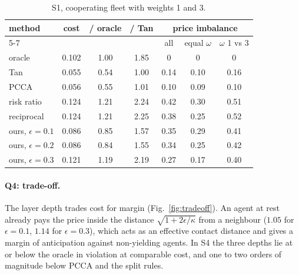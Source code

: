 \documentclass[11pt]{article}
\theoremstyle{definition}
\theoremstyle{remark}
\begin{document}
\begin{table}[h]
\centering\small
\begin{tabular}{lcccccc}
\toprule
method & cost & / oracle & / Tan & \multicolumn{3}{c}{price imbalance}\\
\cmidrule(lr){5-7}
 & & & & all & equal $\omega$ & $\omega$ 1 vs 3\\
\midrule
oracle & 0.102 & 1.00 & 1.85 & 0 & 0 & 0\\
Tan & 0.055 & 0.54 & 1.00 & 0.14 & 0.10 & 0.16\\
PCCA & 0.056 & 0.55 & 1.01 & 0.10 & 0.09 & 0.10\\
risk ratio & 0.124 & 1.21 & 2.24 & 0.42 & 0.30 & 0.51\\
reciprocal & 0.124 & 1.21 & 2.25 & 0.38 & 0.25 & 0.52\\
ours, $\epsilon=0.1$ & 0.086 & 0.85 & 1.57 & 0.35 & 0.29 & 0.41\\
ours, $\epsilon=0.2$ & 0.086 & 0.84 & 1.55 & 0.34 & 0.25 & 0.42\\
ours, $\epsilon=0.3$ & 0.121 & 1.19 & 2.19 & 0.27 & 0.17 & 0.40\\
\bottomrule
\end{tabular}
\caption{S1, cooperating fleet with weights 1 and 3.}
\label{tab:s1}
\end{table}

\paragraph{Q4: trade-off.} The layer depth trades cost for margin (Fig.~\ref{fig:tradeoff}). An agent at rest already pays the price inside the distance $\sqrt{1+2\epsilon/\kappa}$ from a neighbour ($1.05$ for $\epsilon=0.1$, $1.14$ for $\epsilon=0.3$), which acts as an effective contact distance and gives a margin of anticipation against non-yielding agents. In S4 the three depths lie at or below the oracle in violation at comparable cost, and one to two orders of magnitude below PCCA and the split rules.
\end{document}
